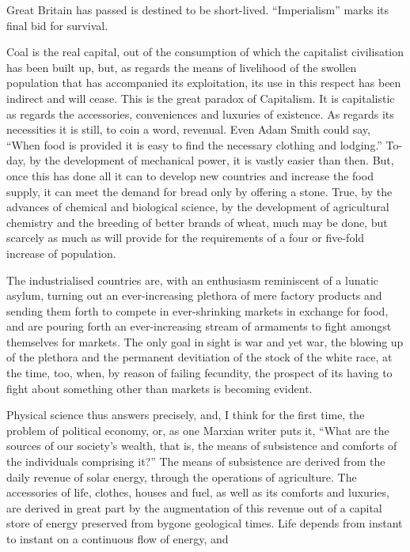 \documentclass[10.5pt,twoside]{book}
\newcommand{\origpage}[1]{\clearpage\setcounter{page}{#1}}
\begin{document}
\origpage{12}

\noindent Great Britain has passed is destined to be short-lived.
``Imperialism'' marks its final bid for survival.

Coal is the real capital, out of the consumption of which the capitalist
civilisation has been built up, but, as regards the means of livelihood of the
swollen population that has accompanied its exploitation, its use in this
respect has been indirect and will cease. This is the great paradox of
Capitalism. It is capitalistic as regards the accessories, conveniences and
luxuries of existence. As regards its necessities it is still, to coin a word,
revenual. Even Adam Smith could say, ``When food is provided it is easy to
find the necessary clothing and lodging.'' To-day, by the development of
mechanical power, it is vastly easier than then. But, once this has done all
it can to develop new countries and increase the food supply, it can meet the
demand for bread only by offering a stone. True, by the advances of chemical
and biological science, by the development of agricultural chemistry and the
breeding of better brands of wheat, much may be done, but scarcely as much as
will provide for the requirements of a four or five-fold increase of
population.

The industrialised countries are, with an enthusiasm reminiscent of a lunatic
asylum, turning out an ever-increasing plethora of mere factory products and
sending them forth to compete in ever-shrinking markets in exchange for food,
and are pouring forth an ever-increasing stream of armaments to fight amongst
themselves for markets. The only goal in sight is war and yet war, the blowing
up of the plethora and the permanent devitiation of the stock of the white
race, at the time, too, when, by reason of failing fecundity, the prospect of
its having to fight about something other than markets is becoming evident.

Physical science thus answers precisely, and, I think for the first time, the
problem of political economy, or, as one Marxian writer puts it, ``What are
the sources of our society's wealth, that is, the means of subsistence and
comforts of the individuals comprising it?'' The means of subsistence are
derived from the daily revenue of solar energy, through the operations of
agriculture. The accessories of life, clothes, houses and fuel, as well as its
comforts and luxuries, are derived in great part by the augmentation of this
revenue out of a capital store of energy preserved from bygone geological
times. Life depends from instant to instant on a continuous flow of energy,
and
\end{document}
